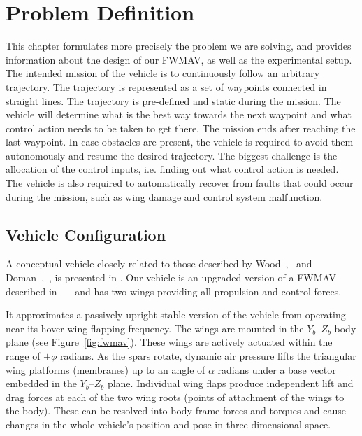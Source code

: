 \chapter{Problem Definition}
\label{ch:problem}

This chapter formulates more precisely the problem we are solving, and provides information about the design of our FWMAV, as well as the experimental setup.
The intended mission of the vehicle is to continuously follow an arbitrary trajectory. The trajectory is represented as a set of waypoints connected in straight lines. The trajectory is pre-defined and static during the mission. The vehicle will determine what is the best way towards the next waypoint and what control action needs to be taken to get there. The mission ends after reaching the last waypoint. In case obstacles are present, the vehicle is required to avoid them autonomously and resume the desired trajectory. The biggest challenge is the allocation of the control inputs, i.e. finding out what control action is needed. The vehicle is also required to automatically recover from faults that could occur during the mission, such as wing damage and control system malfunction. 

\section{Vehicle Configuration}
\label{sec-vehicle-configuration}

A conceptual vehicle closely related to those described by Wood~\cite{Wood2008},~\cite{robobees} and Doman~\cite{afrl1},~\cite{afrl2}, is presented in \cite{gallagher}.
Our vehicle is an upgraded version of a FWMAV described in~\cite{Perseghetti}~\cite{Boddhu}~\cite{Botha} and has two wings providing all propulsion and control forces.

It approximates a passively upright-stable version of the vehicle from \cite{gallagher} operating near its hover wing flapping frequency. The wings are mounted in the $Y_b$--$Z_b$ body plane (see Figure~\ref{fig:fwmav}). These wings are actively actuated within the range of $\pm\phi$ radians. As the spars rotate, dynamic air pressure lifts the triangular wing platforms (membranes) up to an angle of $\alpha$ radians under a base vector embedded in the $Y_b$--$Z_b$ plane. Individual wing flaps produce independent lift and drag forces at each of the two wing roots (points of attachment of the wings to the body). These can be resolved into body frame forces and torques and cause changes in the whole vehicle’s position and pose in three-dimensional space.

